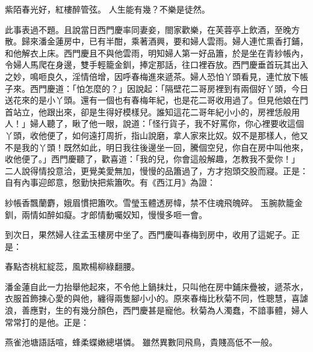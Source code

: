 \begin{showcontents}{}
紫陌春光好，紅樓醉管弦。
人生能有幾？不樂是徒然。

此事表過不題。且說當日西門慶率同妻妾，閤家歡樂，在芙蓉亭上飲酒，至晚方散。歸來潘金蓮房中，已有半酣，乘著酒興，要和婦人雲雨。婦人連忙熏香打鋪，和他解衣上床。西門慶且不與他雲雨，明知婦人第一好品簫，於是坐在青紗帳內，令婦人馬爬在身邊，雙手輕籠金釧，捧定那話，往口裡吞放。西門慶垂首玩其出入之妙，鳴咂良久，淫情倍增，因呼春梅進來遞茶。婦人恐怕丫頭看見，連忙放下帳子來。西門慶道：「怕怎麼的？」因說起：「隔壁花二哥房裡到有兩個好丫頭，今日送花來的是小丫頭。還有一個也有春梅年紀，也是花二哥收用過了。但見他娘在門首站立，他跟出來，卻是生得好模樣兒。誰知這花二哥年紀小小的，房裡恁般用人！」婦人聽了，瞅了他一眼，說道：「怪行貨子，我不好罵你，你心裡要收這個丫頭，收他便了，如何遠打周折，指山說磨，拿人家來比奴。奴不是那樣人，他又不是我的丫頭！既然如此，明日我往後邊坐一回，騰個空兒，你自在房中叫他來，收他便了。」西門慶聽了，歡喜道：「我的兒，你會這般解趣，怎教我不愛你！」 二人說得情投意洽，更覺美愛無加，慢慢的品簫過了，方才抱頭交股而寢。正是：自有內事迎郎意，慇勤快把紫簫吹。有《西江月》為證：

紗帳香飄蘭麝，娥眉慣把簫吹。雪瑩玉體透房幃，禁不住魂飛魄碎。
玉腕款籠金釧，兩情如醉如癡。才郎情動囑奴知，慢慢多咂一會。

到次日，果然婦人往孟玉樓房中坐了。西門慶叫春梅到房中，收用了這妮子。正是：

春點杏桃紅綻蕊，風欺楊柳綠翻腰。

潘金蓮自此一力抬舉他起來，不令他上鍋抹灶，只叫他在房中鋪床疊被，遞茶水，衣服首飾揀心愛的與他，纏得兩隻腳小小的。原來春梅比秋菊不同，性聰慧，喜謔浪，善應對，生的有幾分顏色，西門慶甚是寵他。秋菊為人濁蠢，不諳事體，婦人常常打的是他。正是：

燕雀池塘語話喧，蜂柔蝶嫩總堪憐。
雖然異數同飛鳥，貴賤高低不一般。






\end{showcontents}


